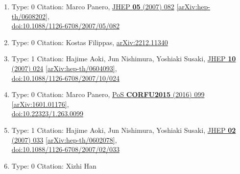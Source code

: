 \documentclass[a4paper,10pt]{article}
\begin{document}
\begin{enumerate}
\begin{enumerate}
  \item Type: 0 Citation: Marco Panero, \href{https://www.doi.org/10.1088/1126-6708/2007/05/082}{JHEP {\bf 05} (2007) 082}  \href{https://arxiv.org/abs/hep-th/0608202}{[arXiv:hep-th/0608202]},\\\href{https://www.doi.org/10.1088/1126-6708/2007/05/082}{doi:10.1088/1126-6708/2007/05/082}
  \item Type: 0 Citation: Kostas Filippas, \href{https://arxiv.org/abs/2212.11340}{arXiv:2212.11340}
  \item Type: 1 Citation: Hajime Aoki, Jun Nishimura, Yoshiaki Susaki, \href{https://www.doi.org/10.1088/1126-6708/2007/10/024}{JHEP {\bf 10} (2007) 024}  \href{https://arxiv.org/abs/hep-th/0604093}{[arXiv:hep-th/0604093]},\\\href{https://www.doi.org/10.1088/1126-6708/2007/10/024}{doi:10.1088/1126-6708/2007/10/024}
  \item Type: 0 Citation: Marco Panero, \href{https://www.doi.org/10.22323/1.263.0099}{PoS {\bf CORFU2015} (2016) 099}  \href{https://arxiv.org/abs/1601.01176}{[arXiv:1601.01176]},\\\href{https://www.doi.org/10.22323/1.263.0099}{doi:10.22323/1.263.0099}
  \item Type: 1 Citation: Hajime Aoki, Jun Nishimura, Yoshiaki Susaki, \href{https://www.doi.org/10.1088/1126-6708/2007/02/033}{JHEP {\bf 02} (2007) 033}  \href{https://arxiv.org/abs/hep-th/0602078}{[arXiv:hep-th/0602078]},\\\href{https://www.doi.org/10.1088/1126-6708/2007/02/033}{doi:10.1088/1126-6708/2007/02/033}
  \item Type: 0 Citation: Xizhi Han

\end{enumerate}
\end{enumerate}
\end{document}
